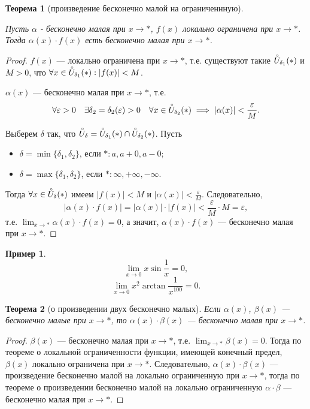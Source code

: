 \documentclass[a4paper,12pt]{article} %
\newtheorem{theorem}{Теорема}[section]
\theoremstyle{remark}
\theoremstyle{definition}
\newtheorem{exmp}{Пример}[section]
\begin{document}
\begin{theorem}[произведение бесконечно малой на ограниченнную]\

	\noindent Пусть $\alpha$ - бесконечно малая при $x \to *$, $f(x)$ локально ограничена при  $x\to *$.
    Тогда $\alpha(x)\cdot f(x)$ есть бесконечно малая при $x\to *$.
\end{theorem}
\begin{proof}
    $f(x)$ --- локально ограничена при $x\to *$, т.е. существуют такие $\accentset{\circ}{U}_{\delta_1}(*)$ и $M>0$,
    что $\forall x \in \accentset{\circ}{U}_{\delta_1}(*) : |f(x)| < M$.

    $\alpha(x)$ --- бесконечно малая при $x \to  *$, т.е.
    \[\forall \varepsilon> 0 \quad \exists \delta_2=\delta_2(\varepsilon)>0 \quad \forall x\in \accentset    
    {\circ}{U}_{\delta_2}(*) \implies |\alpha(x)| < \frac{\varepsilon}{M}.\] 

    Выберем $\delta$ так, что $\accentset{\circ}{U}_\delta=\accentset{\circ}{U}_{\delta_1}(*)\cap 
    \accentset{\circ}{U}_{\delta_2}(*)$.  Пусть 
    \begin{itemize}
        \item $\delta = \min \{\delta_1, \delta_2\} $, если $*: a, a + 0, a - 0$;
        \item $\delta=\max \{\delta_1, \delta_2\} $, если $*: \infty, +\infty, -\infty$.
    \end{itemize}
    Тогда $\forall x\in \accentset{\circ}{U}_\delta(*)$ имеем $|f(x)|<M$ и $\displaystyle |\alpha(x)| < \frac{\varepsilon}{M}$.
    Следовательно,
    \[|\alpha(x)\cdot f(x)| = |\alpha(x)| \cdot |f(x)| < \frac{\varepsilon}{M} \cdot M = \varepsilon,\] 
    т.е. $\displaystyle \lim_{x \to *} \alpha(x)\cdot f(x) = 0$, а значит, $\alpha(x) \cdot f(x)$ 
    --- бесконечно малая при $x\to *$.

    
    
\end{proof}
\begin{exmp}
    \[ \lim_{x \to 0} x \sin{\frac{1}{x}} = 0 ,\] 
    \[ \lim_{x \to 0} x^2 \arctan{\frac{1}{x^{100}}} = 0 .\] 
\end{exmp}

\begin{theorem}[о произведении двух бесконечно малых]
	Если $\alpha(x)$, $\beta(x)$ --- бесконечно малые при $x \to *$, то $\alpha(x)\cdot \beta(x)$ 
    --- бесконечно малая при $x \to *$.
\end{theorem}
\begin{proof}
	$\beta(x)$ --- бесконечно малая при $x \to  *$, т.е. $\displaystyle  \lim_{x \to *} \beta(x) = 0$.
    Тогда по теореме о локальной ограниченности функции, имеющей конечный предел, $\beta(x)$ локально ограничена при $x\to *$.
    Следовательно, $\alpha(x)\cdot \beta(x)$ --- произведение бесконечно малой на локально ограниченную при $x\to *$,
    тогда по теореме о произведении бесконечно малой на локально ограниченную $\alpha\cdot \beta$ 
    --- бесконечно малая при $x \to *$.
\end{proof}
\end{document}
